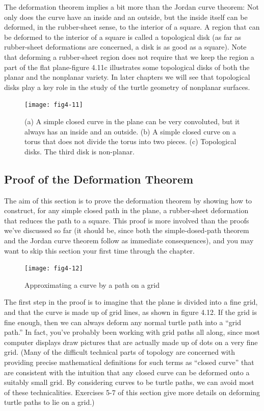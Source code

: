 \documentclass{book}
\begin{document}
The deformation theorem implies a bit more than the Jordan curve
theorem: Not only does the curve have an inside and an outside, but
the inside itself can be deformed, in the rubber-sheet sense, to the
interior of a square. A region that can be deformed to the interior of a
square is called a topological disk (as far as rubber-sheet deformations
are concerned, a disk is as good as a square). Note that deforming a
rubber-sheet region does not require that we keep the region a part of
the flat plane-figure 4.11c illustrates some topological disks of both the
planar and the nonplanar variety. In later chapters we will see that
topological disks play a key role in the study of the turtle geometry of
nonplanar surfaces.

\begin{figure}
\begin{center}
\texttt{[image: fig4-11]}
\caption{(a) A simple closed curve in the plane can be very convoluted, but it always has an inside and an outside. (b) A simple closed curve on a torus that does not divide the torus into two pieces. (c) Topological disks. The third disk is non-planar.}
\end{center}
\end{figure}

\subsection{Proof of the Deformation Theorem}

The aim of this section is to prove the deformation theorem by showing
how to construct, for any simple closed path in the plane, a rubber-sheet deformation that reduces the path to a square. This proof is more
involved than the proofs we've discussed so far (it should be, since both
the simple-dosed-path theorem and the Jordan curve theorem follow as
immediate consequences), and you may want to skip this section your
first time through the chapter.

\begin{figure}
\begin{center}
\texttt{[image: fig4-12]}
\caption{Approximating a curve by a path on a grid}
\end{center}
\end{figure}

The first step in the proof is to imagine that the plane is divided into
a fine grid, and that the curve is made up of grid lines, as shown in
figure 4.12. If the grid is fine enough, then we can always deform any
normal turtle path into a ``grid path.'' In fact, you've probably been
working with grid paths all along, since most computer displays draw
pictures that are actually made up of dots on a very fine grid. (Many
of the difficult technical parts of topology are concerned with providing
precise mathematical definitions for such terms as ``closed curve'' that
are consistent with the intuition that any closed curve can be deformed
onto a suitably small grid. By considering curves to be turtle paths, we
can avoid most of these technicalities. Exercises 5-7 of this section give
more details on deforming turtle paths to lie on a grid.)
\end{document}
